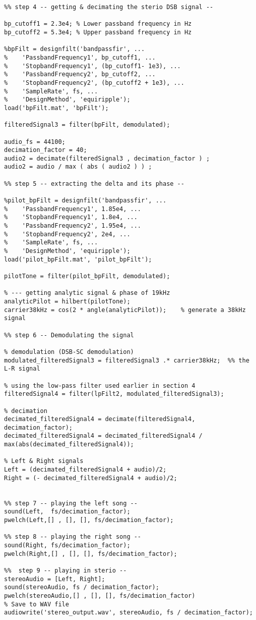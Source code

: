 \documentclass{article}
\begin{document}
\begin{lstlisting}
%% step 4 -- getting & decimating the sterio DSB signal --

bp_cutoff1 = 2.3e4; % Lower passband frequency in Hz
bp_cutoff2 = 5.3e4; % Upper passband frequency in Hz

%bpFilt = designfilt('bandpassfir', ...
%    'PassbandFrequency1', bp_cutoff1, ...
%    'StopbandFrequency1', (bp_cutoff1- 1e3), ...
%    'PassbandFrequency2', bp_cutoff2, ...
%    'StopbandFrequency2', (bp_cutoff2 + 1e3), ...
%    'SampleRate', fs, ...
%    'DesignMethod', 'equiripple');
load('bpFilt.mat', 'bpFilt');

filteredSignal3 = filter(bpFilt, demodulated);

audio_fs = 44100;
decimation_factor = 40;
audio2 = decimate(filteredSignal3 , decimation_factor ) ;
audio2 = audio / max ( abs ( audio2 ) ) ; 

%% step 5 -- extracting the delta and its phase --

%pilot_bpFilt = designfilt('bandpassfir', ...
%    'PassbandFrequency1', 1.85e4, ...
%    'StopbandFrequency1', 1.8e4, ...
%    'PassbandFrequency2', 1.95e4, ...
%    'StopbandFrequency2', 2e4, ...
%    'SampleRate', fs, ...
%    'DesignMethod', 'equiripple');
load('pilot_bpFilt.mat', 'pilot_bpFilt');

pilotTone = filter(pilot_bpFilt, demodulated);

% --- getting analytic signal & phase of 19kHz
analyticPilot = hilbert(pilotTone);
carrier38kHz = cos(2 * angle(analyticPilot));    % generate a 38kHz signal

%% step 6 -- Demodulating the signal

% demodulation (DSB-SC demodulation)
modulated_filteredSignal3 = filteredSignal3 .* carrier38kHz;  %% the L-R signal

% using the low-pass filter used earlier in section 4
filteredSignal4 = filter(lpFilt2, modulated_filteredSignal3);

% decimation
decimated_filteredSignal4 = decimate(filteredSignal4, decimation_factor);
decimated_filteredSignal4 = decimated_filteredSignal4 / max(abs(decimated_filteredSignal4));

% Left & Right signals
Left = (decimated_filteredSignal4 + audio)/2;
Right = (- decimated_filteredSignal4 + audio)/2;


%% step 7 -- playing the left song --
sound(Left,  fs/decimation_factor);
pwelch(Left,[] , [], [], fs/decimation_factor);

%% step 8 -- playing the right song --
sound(Right, fs/decimation_factor);
pwelch(Right,[] , [], [], fs/decimation_factor);

%%  step 9 -- playing in sterio --
stereoAudio = [Left, Right];
sound(stereoAudio, fs / decimation_factor);
pwelch(stereoAudio,[] , [], [], fs/decimation_factor)
% Save to WAV file
audiowrite('stereo_output.wav', stereoAudio, fs / decimation_factor);
\end{lstlisting}
\end{document}

